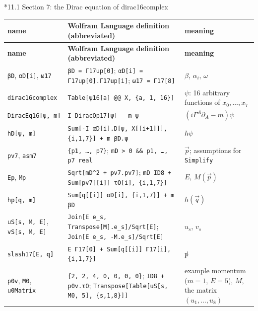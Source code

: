 \documentclass[10pt,a4paper]{article}
\makeatletter
\renewcommand\subsection{\@startsection{subsection}{2}{\z@}{-3.25ex\@plus -1ex \@minus -.2ex}{1.5ex \@plus .2ex}{\normalfont\large\bfseries\raggedright}}
\makeatother
\begin{document}
\subsection*{11.1 Section 7: the Dirac equation of dirac16complex}
{\footnotesize
\begin{longtable}{>{\raggedright\arraybackslash}p{}>{\raggedright\arraybackslash}p{}>{\raggedright\arraybackslash}p{}}
\toprule
\textbf{name} & \textbf{Wolfram Language definition (abbreviated)} & \textbf{meaning} \\
\midrule\endfirsthead
\toprule
\textbf{name} & \textbf{Wolfram Language definition (abbreviated)} & \textbf{meaning} \\
\midrule\endhead
\endfoot
\bottomrule\endlastfoot
\texttt{βD}, \texttt{αD[i]}, \texttt{ω17} & \texttt{βD = Γ17up[0]}; \texttt{αD[i] = Γ17up[0].Γ17up[i]}; \texttt{ω17 = Γ17[8]} & $\beta$, $\alpha_i$, $\omega$ \\
\texttt{dirac16complex} & \texttt{Table[ψ16[a] @@ X, \{a, 1, 16\}]} & $\psi$: 16 arbitrary functions of $x_0,\dots,x_7$ \\
\texttt{DiracEq16[ψ, m]} & \texttt{I DiracOp17[ψ] - m ψ} & $(i\Gamma^A\partial_A-m)\psi$ \\
\texttt{hD[ψ, m]} & \texttt{Sum[-I αD[i].D[ψ, X[[i+1]]], \{i,1,7\}] + m βD.ψ} & $h\psi$ \\
\texttt{pv7}, \texttt{asm7} & \texttt{\{p1, …, p7\}}; \texttt{mD > 0 \&\& p1, …, p7 real} & $\vec p$; assumptions for \texttt{Simplify} \\
\texttt{Ep}, \texttt{Mp} & \texttt{Sqrt[mD\textasciicircum{}2 + pv7.pv7]}; \texttt{mD ID8 + Sum[pv7[[i]] τO[i], \{i,1,7\}]} & $E$, $M(\vec p)$ \\
\texttt{hp[q, m]} & \texttt{Sum[q[[i]] αD[i], \{i,1,7\}] + m βD} & $h(\vec q)$ \\
\texttt{uS[s, M, E]}, \texttt{vS[s, M, E]} & \texttt{Join[E e\_\allowbreak{}s, Transpose[M].e\_\allowbreak{}s]/\allowbreak{}Sqrt[E]}; \texttt{Join[E e\_\allowbreak{}s, -M.e\_\allowbreak{}s]/\allowbreak{}Sqrt[E]} & $u_s$, $v_s$ \\
\texttt{slash17[E, q]} & \texttt{E Γ17[0] + Sum[q[[i]] Γ17[i], \{i,1,7\}]} & $\not p$ \\
\texttt{p0v}, \texttt{M0}, \texttt{u0Matrix} & \texttt{\{2, 2, 4, 0, 0, 0, 0\}}; \texttt{ID8 + p0v.τO}; \texttt{Transpose[Table[uS[s, M0, 5], \{s,1,8\}]]} & example momentum ($m=1$, $E=5$), $M$, the matrix $(u_1,\dots,u_8)$ \\

\end{longtable}}
\end{document}
